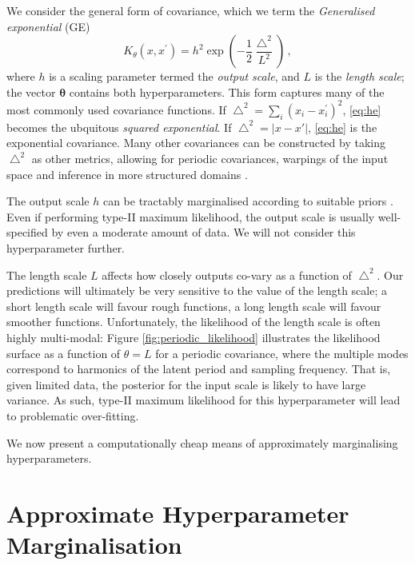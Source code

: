 \documentclass{article}
\begin{document}
We consider the general form of covariance, which we term the {\it Generalised exponential} (GE)
\begin{equation}\label{eq:ge} 
K_\theta(x,x^\prime) = h^2 \exp \left( -\frac{1}{2} \frac{\bigtriangleup^2}{L^2} \right)\,,
\end{equation} 
where $h$ is a scaling parameter termed the \emph{output scale}, and $L$ is the \emph{length scale}; the vector  $\bm{\theta}$ contains both hyperparameters. This form captures many of the most commonly used covariance functions. If $\bigtriangleup^2 = \sum_i (x_i - x_i^\prime)^2$, \eqref{eq:he} becomes the ubquitous  \emph{squared exponential}. If $\bigtriangleup^2 = |x-x'|$,  \eqref{eq:he} is the exponential covariance. Many other covariances can be constructed by taking $\bigtriangleup^2$ as other metrics, allowing for periodic covariances, warpings of the input space \citep{snelson2004warped} and inference in more structured domains \citep{garnett2010bayesian}.
 
The output scale $h$ can be tractably marginalised according to suitable priors \citep{kennedy1998bayesian}. Even if performing type-II maximum likelihood, the output scale is usually well-specified by even a moderate amount of data. We will not consider this hyperparameter further. 
 
The length scale $L$ affects how closely outputs co-vary as a function of $\bigtriangleup^2$. Our predictions will ultimately be very sensitive to the value of the length scale; a short length scale will favour rough functions, a long length scale will favour smoother functions. Unfortunately, the likelihood of the length scale is often highly multi-modal: Figure \ref{fig:periodic_likelihood} illustrates the likelihood surface as a function of $\theta = L$ for a periodic covariance, where the multiple modes correspond to harmonics of the latent period and sampling frequency. That is, given limited data, the posterior for the input scale is likely to have large variance. As such, type-II maximum likelihood for this hyperparameter will lead to problematic over-fitting. 

 We now present a computationally cheap means of approximately marginalising hyperparameters.

\section{Approximate Hyperparameter Marginalisation}
\end{document}
